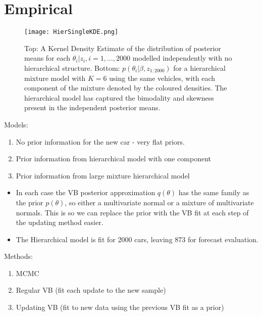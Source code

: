 \documentclass[12pt,a4paper]{article}\usepackage[]{graphicx}\usepackage[]{color}
\begin{document}
\section{Empirical}

\begin{figure}[ht]
\centering
\texttt{[image: HierSingleKDE.png]}
\caption{Top: A Kernel Density Estimate of the distribution of posterior means for each $\theta_i | z_i, i = 1, \dots, 2000$ modelled independently with no hierarchical structure. Bottom: $p(\theta_i | \beta, z_{1:2000})$ for a hierarchical mixture model with $K = 6$ using the same vehicles, with each component of the mixture denoted by the coloured densities. The hierarchical model has captured the bimodality and skewness present in the independent posterior means.}
\label{fig:HierSingleKDE}
\end{figure}

Models:
\begin{enumerate}
\item No prior information for the new car - very flat priors.
\item Prior information from hierarchical model with one component
\item Prior information from large mixture hierarchical model
\end{enumerate}
\begin{itemize}
\item In each case the VB posterior approximation $q(\theta)$ has the same family as the prior $p(\theta)$, so either a multivariate normal or a mixture of multivariate normals. This is so we can replace the prior with the VB fit at each step of the updating method easier. 
\item The Hierarchical model is fit for 2000 cars, leaving 873 for forecast evaluation.
\end{itemize}

Methods:
\begin{enumerate}
\item MCMC
\item Regular VB (fit each update to the new sample)
\item Updating VB (fit to new data using the previous VB fit as a prior)
\end{enumerate}
\end{document}
